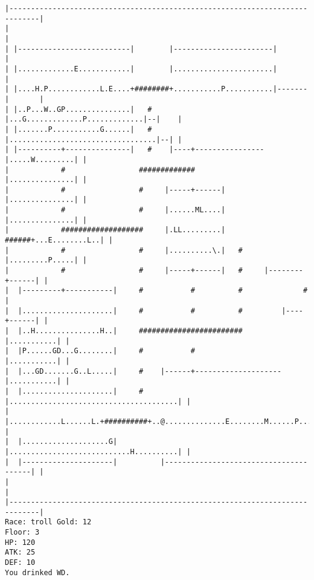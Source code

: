 \documentclass[11pt]{article}
\theoremstyle{plain}
\begin{document}
\begin{Verbatim}[fontsize=\scriptsize]
|-----------------------------------------------------------------------------|
|                                                                             |
| |--------------------------|        |-----------------------|               |
| |.............E............|        |.......................|               |
| |....H.P............L.E....+########+...........P...........|-------|       |
| |..P...W..GP...............|   #    |...G.............P.............|--|    |
| |.......P...........G......|   #    |..................................|--| |
| |----------+---------------|   #    |----+----------------|.....W.........| |
|            #                 #############                |...............| |
|            #                 #     |-----+------|         |...............| |
|            #                 #     |......ML....|         |...............| |
|            ###################     |.LL.........|   ######+...E........L..| |
|            #                 #     |..........\.|   #     |.........P.....| |
|            #                 #     |-----+------|   #     |--------+------| |
|  |---------+-----------|     #           #          #              #        |
|  |.....................|     #           #          #         |----+------| |
|  |..H...............H..|     ########################         |...........| |
|  |P......GD...G........|     #           #                    |...........| |
|  |...GD.......G..L.....|     #    |------+--------------------|...........| |
|  |.....................|     #    |.......................................| |
|  |............L......L.+##########+..@..............E........M......P.....| |
|  |....................G|          |............................H..........| |
|  |---------------------|          |---------------------------------------| |
|                                                                             |
|-----------------------------------------------------------------------------|
Race: troll Gold: 12                                                   Floor: 3
HP: 120
ATK: 25
DEF: 10
You drinked WD. 
\end{Verbatim}
\end{document}
